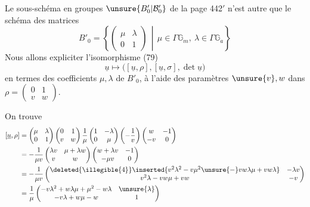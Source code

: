 Le sous-schéma en groupes $\unsure{B'_0|\mathcal B'_0}$ de la page 442$'$ n'est autre que le schéma des matrices
\[
B'_0=\left\{\begin{pmatrix}\mu&\lambda\\0&1\end{pmatrix}
\,\middle|\,\mu\in\Gamma\mathbb G_m,\ \lambda\in\Gamma\mathbb G_a\right\} \tag{44}
\]
Nous allons expliciter l'isomorphisme (79)
\[
\underline u\longmapsto\bigl([\underline u,\rho],[\underline u,\sigma],\det\underline u\bigr) \tag{45}
\]
en termes des coefficients $\mu,\lambda$ de $B'_0$, à l'aide des paramètres
$\unsure{v},w$ dans $\rho=\begin{pmatrix}0&1\\v&w\end{pmatrix}$.


On trouve
\[
\begin{aligned}
{}[\underline u,\rho]
&=\begin{pmatrix}\mu&\lambda\\0&1\end{pmatrix}
\begin{pmatrix}0&1\\v&w\end{pmatrix}
\frac1\mu\begin{pmatrix}1&-\lambda\\0&\mu\end{pmatrix}
\left(-\frac1v\right)\begin{pmatrix}w&-1\\-v&0\end{pmatrix}\\
&=-\frac1{\mu v}\begin{pmatrix}\lambda v&\mu+\lambda w\\v&w\end{pmatrix}
\begin{pmatrix}w+\lambda v&-1\\-\mu v&0\end{pmatrix}\\
&=-\frac1{\mu v}
\begin{pmatrix}
\deleted{\illegible{4}}\inserted{v^2\lambda^2-v\mu^2\unsure{-}vw\lambda\mu+vw\lambda}&-\lambda v\\
v^2\lambda-vw\mu+vw&-v
\end{pmatrix}\\
&=\frac1\mu\begin{pmatrix}
-v\lambda^2+w\lambda\mu+\mu^2-w\lambda&\unsure{\lambda}\\
-v\lambda+w\mu-w&1
\end{pmatrix}
\end{aligned}
\]

